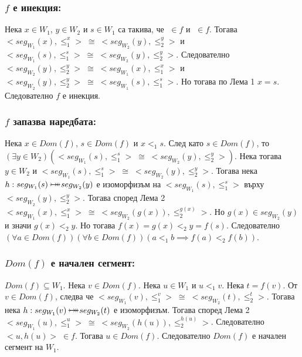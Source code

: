 \documentclass[12pt]{article}
\newcommand{\bijection}[0]{\mathbin{\mathlarger{\mathlarger{\rightarrowtail}} \hspace{-14pt} \mathlarger{\mathlarger{\twoheadrightarrow}}}}
\begin{document}
\subsubsection*{\(f\) е инекция:}
Нека \(x \in W_1\), \(y \in W_2\) и \(s \in W_1\)
са такива, че \(<x, y> \; \in f\) и \(<s, y> \; \in f\).
Тогава \(<seg_{W_1}(x), \leq_1^x> \; \cong \; <seg_{W_2}(y), \leq_2^y>\)
и \(<seg_{W_1}(s), \leq_1^s> \; \cong \; <seg_{W_2}(y), \leq_2^y>\).
Следователно \(<seg_{W_2}(y), \leq_2^y> \; \cong \; <seg_{W_1}(x), \leq_1^x>\)
и \(<seg_{W_2}(y), \leq_2^y> \; \cong \; <seg_{W_1}(s), \leq_1^s>\).
Но тогава по Лема 1 \(x = s\).
Следователно \(f\) е инекция.

\subsubsection*{\(f\) запазва наредбата:}
Нека \(x \in Dom(f)\), \(s \in Dom(f)\) и \(x <_1 s\).
След като \(s \in Dom(f)\), то
\((\exists y \in W_2)(<seg_{W_1}(s), \leq_1^s> \; \cong \; <seg_{W_2}(y), \leq_2^y>)\).
Нека тогава \(y \in W_2\) и
\(<seg_{W_1}(s), \leq_1^s> \; \cong \; <seg_{W_2}(y), \leq_2^y>\).
Тогава нека \(h : seg_{W_1}(s) \bijection seg_{W_2}(y)\) е изоморфизъм на
\(<seg_{W_1}(s), \leq_1^s>\) върху \(<seg_{W_2}(y), \leq_2^y>\).
Тогава според Лема 2
\(<seg_{W_1}(x), \leq_1^x> \; \cong \; <seg_{W_2}(g(x)), \leq_2^{g(x)}>\).
Но \(g(x) \in seg_{W_2}(y)\) и значи \(g(x) <_2 y\).
Но тогава \(f(x) = g(x) <_2 y = f(s)\).
Следователно
\((\forall a \in Dom(f))(\forall b \in Dom(f))(a <_1 b \implies f(a) <_2 f(b))\).

\subsubsection*{\(Dom(f)\) е начален сегмент:}
\(Dom(f) \subseteq W_1\).
Нека \(v \in Dom(f)\). Нека \(u \in W_1\) и \(u <_1 v\).
Нека \(t = f(v)\).
От \(v \in Dom(f)\), следва че
\(<seg_{W_1}(v), \leq_1^v> \; \cong \; <seg_{W_2}(t), \leq_2^{t}>\).
Тогава нека \(h : seg_{W_1}(v) \bijection seg_{W_2}(t)\) е изоморфизъм.
Тогава според Лема 2
\\
\(<seg_{W_1}(u), \leq_1^u> \; \cong \; <seg_{W_2}(h(u)), \leq_2^{h(u)}>\).
Следователно \(<u, h(u)> \; \in f\).
Тогава \(u \in Dom(f)\).
Следователно \(Dom(f)\) е начален сегмент на \(W_1\).
\end{document}
